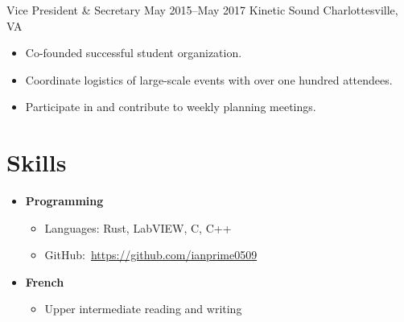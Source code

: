 \documentclass[12pt]{article}
\begin{document}
\entry
    {Vice President \& Secretary}
    {May 2015--May 2017}
    {Kinetic Sound}
    {Charlottesville, VA}
\begin{itemize}
    \item Co-founded successful student organization.
    \item Coordinate logistics of large-scale events with over one hundred attendees.
    \item Participate in and contribute to weekly planning meetings.
\end{itemize}

\section*{Skills}
\begin{itemize}
    \item {\bf Programming}
    \begin{itemize}
        \item Languages: Rust, LabVIEW, C, C++
        \item GitHub:~\url{https://github.com/ianprime0509}
    \end{itemize}
    \item {\bf French}
    \begin{itemize}
        \item Upper intermediate reading and writing
    \end{itemize}
\end{itemize}
\end{document}
